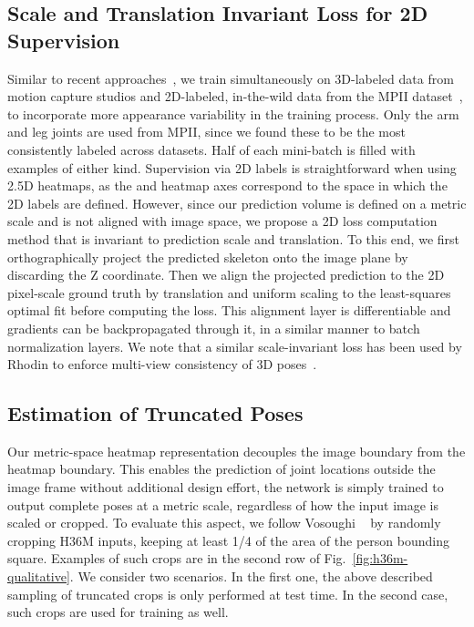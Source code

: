 \begin{figure*}
\caption{Qualitative results of our method on different datasets. Predictions are shown in color, ground truth in gray (except for MPII, where it is unavailable). Green spheres mark predictions within 150 mm of the ground truth, red cubes beyond that threshold. \emph{Best viewed in color.}}
\label{fig:h36m-qualitative}
\end{figure*} \subsection{Scale and Translation Invariant Loss for 2D Supervision}
Similar to recent approaches~\cite{Zhou17ICCV,Sun18ECCV,Luvizon18CVPR}, we train simultaneously on 3D-labeled data from motion capture studios and 2D-labeled, in-the-wild data from the MPII dataset~\cite{Andriluka14CVPR}, to incorporate more appearance variability in the training process.
Only the arm and leg joints are used from MPII, since we found these to be the most consistently labeled across datasets.
Half of each mini-batch is filled with examples of either kind.
Supervision via 2D labels is straightforward when using 2.5D heatmaps, as the  and  heatmap axes correspond to the space in which the 2D labels are defined.
However, since our prediction volume is defined on a metric scale and is not aligned with image space, we propose a 2D loss computation method that is invariant to prediction scale and translation.
To this end, we first orthographically project the predicted skeleton onto the image plane by discarding the Z coordinate.
Then we align the projected prediction to the 2D pixel-scale ground truth by translation and uniform scaling to the least-squares optimal fit before computing the loss.
This alignment layer is differentiable and gradients can be backpropagated through it, in a similar manner to batch normalization layers.
We note that a similar scale-invariant loss has been used by Rhodin \etal to enforce multi-view consistency of 3D poses~\cite{Rhodin18CVPR}.
\subsection{Estimation of Truncated Poses}
Our metric-space heatmap representation decouples the image boundary from the heatmap boundary.
This enables the prediction of joint locations outside the image frame without additional design effort, the network is simply trained to output complete poses at a metric scale, regardless of how the input image is scaled or cropped.
To evaluate this aspect, we follow Vosoughi \etal~\cite{Vosoughi18ICIP} by randomly cropping H36M inputs, keeping at least 1/4 of the area of the person bounding square.
Examples of such crops are in the second row of Fig.~\ref{fig:h36m-qualitative}.
We consider two scenarios.
In the first one, the above described sampling of truncated crops is only performed at test time.
In the second case, such crops are used for training as well.
